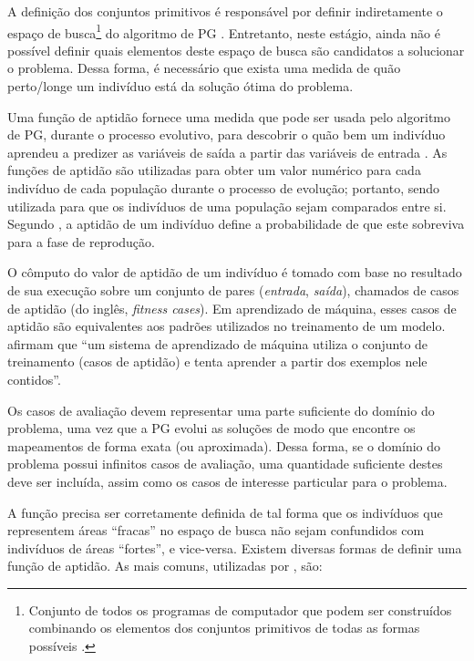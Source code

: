 A definição dos conjuntos primitivos é responsável por definir indiretamente o espaço de busca\footnote{Conjunto de todos os programas de computador que podem ser construídos combinando os elementos dos conjuntos primitivos de todas as formas possíveis \cite{poli2008}.} do algoritmo de PG \cite{poli2008}. Entretanto, neste estágio, ainda não é possível definir quais elementos deste espaço de busca são candidatos a solucionar o problema. Dessa forma, é necessário que exista uma medida de quão perto/longe um indivíduo está da solução ótima do problema.

Uma função de aptidão fornece uma medida que pode ser usada pelo algoritmo de PG, durante o processo evolutivo, para descobrir o quão bem um indivíduo aprendeu a predizer as variáveis de saída a partir das variáveis de entrada \cite{banzhaf1998}. As funções de aptidão são utilizadas para obter um valor numérico para cada indivíduo de cada população durante o processo de evolução; portanto, sendo utilizada para que os indivíduos de uma população sejam comparados entre si. Segundo , a aptidão de um indivíduo define a probabilidade de que este sobreviva para a fase de reprodução.

O cômputo do valor de aptidão de um indivíduo é tomado com base no resultado de sua execução sobre um conjunto de pares (\textit{entrada}, \textit{saída}), chamados de casos de aptidão (do inglês, \textit{fitness cases}). Em aprendizado de máquina, esses casos de aptidão são equivalentes aos padrões utilizados no treinamento de um modelo.  afirmam que ``um sistema de aprendizado de máquina utiliza o conjunto de treinamento (casos de aptidão) e tenta aprender a partir dos exemplos nele contidos''. %

Os casos de avaliação devem representar uma parte suficiente do domínio do problema, uma vez que a PG evolui as soluções de modo que encontre os mapeamentos de forma exata (ou aproximada). Dessa forma, se o domínio do problema possui infinitos casos de avaliação, uma quantidade suficiente destes deve ser incluída, assim como os casos de interesse particular para o problema.

A função precisa ser corretamente definida de tal forma que os indivíduos que representem áreas ``fracas'' no espaço de busca não sejam confundidos com indivíduos de áreas ``fortes'', e vice-versa. Existem diversas formas de definir uma função de aptidão. As mais comuns, utilizadas por , são:

